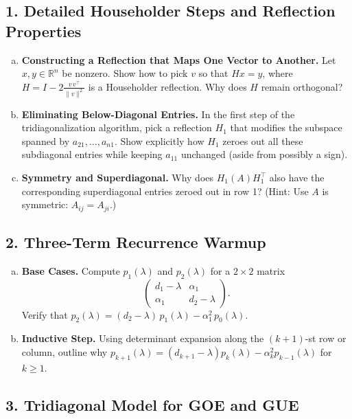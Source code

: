 \documentclass[letterpaper,11pt,oneside,reqno]{article}
\numberwithin{equation}{section}
\theoremstyle{definition}
\begin{document}
\subsection*{1. Detailed Householder Steps and Reflection Properties}

\begin{enumerate}[(a)]
\item {\bf Constructing a Reflection that Maps One Vector to Another.}
  Let $x,y\in \mathbb{R}^n$ be nonzero. Show how to pick $v$ so that $Hx=y$, where $H=I-2\frac{v\,v^\top}{\|v\|^2}$ is a Householder reflection. Why does $H$ remain orthogonal?
\item {\bf Eliminating Below-Diagonal Entries.}
  In the first step of the tridiagonalization algorithm, pick a reflection $H_1$ that modifies the subspace spanned by $a_{21},\dots,a_{n1}$. Show explicitly how $H_1$ zeroes out all these subdiagonal entries while keeping $a_{11}$ unchanged (aside from possibly a sign).
\item {\bf Symmetry and Superdiagonal.}
  Why does $H_1 (A) H_1^\top$ also have the corresponding superdiagonal entries zeroed out in row 1? (Hint: Use $A$ is symmetric: $A_{ij}=A_{ji}$.)
\end{enumerate}

\subsection*{2. Three-Term Recurrence Warmup}

\begin{enumerate}[(a)]
\item {\bf Base Cases.} Compute $p_1(\lambda)$ and $p_2(\lambda)$ for a $2\times2$ matrix
\[
  \begin{pmatrix}
    d_1-\lambda & \alpha_1 \\
    \alpha_1 & d_2-\lambda
  \end{pmatrix}.
\]
Verify that $p_2(\lambda) = (d_2-\lambda)\,p_1(\lambda) - \alpha_1^2\,p_0(\lambda)$.
\item {\bf Inductive Step.} Using determinant expansion along the $(k+1)$-st row or column, outline why $p_{k+1}(\lambda) = (d_{k+1}-\lambda)p_k(\lambda) - \alpha_k^2 p_{k-1}(\lambda)$ for $k\ge1$.
\end{enumerate}

\subsection*{3. Tridiagonal Model for GOE and GUE}
\end{document}
